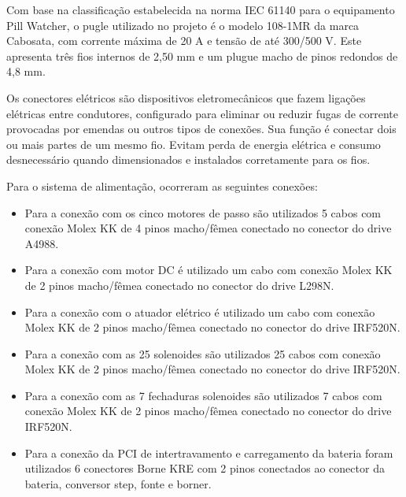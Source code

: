 Com base na classificação estabelecida na norma IEC 61140 para o equipamento Pill Watcher, o pugle utilizado no projeto é o modelo 108-1MR da marca Cabosata, com corrente máxima de 20 A e tensão de até 300/500 V. Este apresenta três fios internos de 2,50 mm e um plugue macho de pinos redondos de 4,8 mm.  

Os conectores elétricos são dispositivos eletromecânicos que fazem ligações elétricas entre condutores, configurado para eliminar ou reduzir fugas de corrente provocadas por emendas ou outros tipos de conexões.  Sua função é conectar dois ou mais partes de um mesmo fio. Evitam perda de energia elétrica e consumo desnecessário quando dimensionados e instalados corretamente para os fios. 

Para o sistema de alimentação, ocorreram as seguintes conexões:


\begin{itemize}

      \item Para a conexão com os cinco motores de passo são utilizados 5 cabos com conexão Molex KK de 4 pinos macho/fêmea conectado no conector do drive A4988.
    \item Para a conexão com motor DC é utilizado um cabo com conexão Molex KK de 2 pinos macho/fêmea conectado no conector do drive L298N.
    \item Para a conexão com o atuador elétrico é utilizado um cabo com conexão Molex KK de 2 pinos macho/fêmea conectado no conector do drive IRF520N.
     \item Para a conexão com as 25 solenoides são utilizados 25 cabos com conexão Molex KK de 2 pinos macho/fêmea conectado no conector do drive IRF520N.
    \item Para a conexão com as 7 fechaduras solenoides são utilizados 7 cabos com conexão Molex KK de 2 pinos macho/fêmea conectado no conector do drive IRF520N.
    \item Para a conexão da PCI de intertravamento e carregamento da bateria foram utilizados 6 conectores Borne KRE com 2 pinos conectados ao conector da bateria, conversor step, fonte e borner.
     
\end{itemize}

  

 

